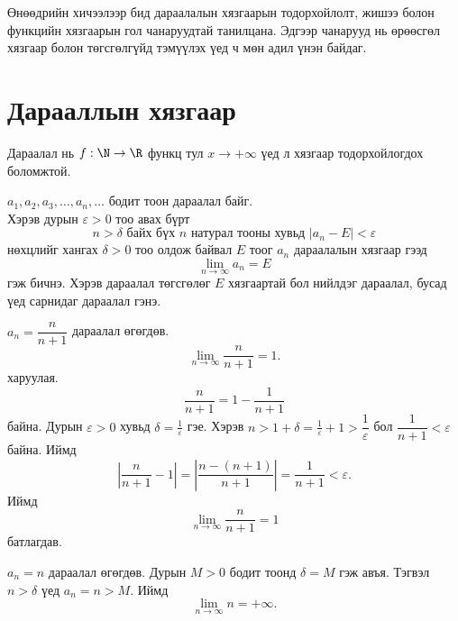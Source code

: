 \noindent Өнөөдрийн хичээлээр бид дараалалын хязгаарын тодорхойлолт, жишээ болон функцийн хязгаарын гол чанаруудтай танилцана. Эдгээр чанарууд нь өрөөсгөл хязгаар болон төгсгөлгүйд тэмүүлэх үед ч мөн адил үнэн байдаг.

\section{Дарааллын хязгаар}
Дараалал нь $f:\N\to\R$ функц тул  $x\to+\infty$ үед л хязгаар тодорхойлогдох боломжтой.\,
\begin{definition}
 $ a_1, a_2, a_3, \ldots, a_n, \ldots$ бодит тоон дараалал байг. \\
Хэрэв дурын $\varepsilon>0$  тоо авах бүрт  
$$n>\delta \text{ байх бүх } n \text{ натурал тооны хувьд } |a_n-E|<\varepsilon$$
нөхцлийг хангах $\delta>0$ тоо олдож байвал $E$ тоог $a_n$ дараалалын  хязгаар гээд $$\lim\limits_{n\to  \infty}a_n=E$$ гэж бичнэ.   Хэрэв дараалал төгсгөлөг $E$ хязгаартай бол нийлдэг дараалал, бусад үед сарнидаг дараалал гэнэ.
\end{definition} 
\begin{example}
$a_n = \dfrac{n}{n+1}$ дараалал өгөгдөв.  \[
\lim_{n\to\infty}\frac{n}{n+1}=1.
\] харуулая.
\[
\frac{n}{n+1}=1-\frac{1}{n+1}
\]  байна.
Дурын $\varepsilon>0$ хувьд $\delta=\frac{1}{\varepsilon}$ гэе. Хэрэв $n>1+\delta=\frac{1}{\varepsilon}+1>\dfrac{1}{\varepsilon}$ бол $\dfrac{1}{n+1}<\varepsilon$ байна. Иймд 
\[
\left|\frac{n}{n+1}-1\right| =\left|\frac{n-(n+1)}{n+1}\right|=\frac{1}{n+1}< \varepsilon.
\]
Иймд
\[
\lim_{n\to\infty}\frac{n}{n+1}=1
\] батлагдав.
\end{example}
\begin{example}
$a_n = n$ дараалал өгөгдөв.  
Дурын $M>0$ бодит тоонд $\delta=M$ гэж авъя. Тэгвэл $n>\delta$ үед $a_n=n>M$.  
Иймд
\[
\lim_{n\to\infty} n = +\infty.
\]
\end{example}



